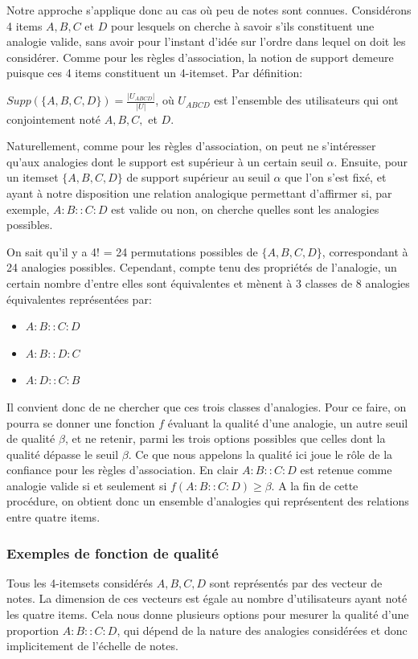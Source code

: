 Notre approche s'applique donc au cas o\`u peu de notes sont connues.  Considérons
4 items  $A, B, C$ et $D$ pour lesquels on cherche à savoir s'ils constituent
une analogie valide, sans avoir pour l'instant d'idée sur l'ordre dans lequel
on doit les considérer. Comme pour les règles d'association, la notion de
support demeure puisque ces 4 items constituent un 4-itemset.  Par
définition:

$Supp(\{A, B, C, D \})= \frac{|U_{ABCD}|}{|U|}$, où $U_{ABCD}$ est l'ensemble
des utilisateurs qui ont conjointement noté $A, B, C,$ et $D$.

Naturellement, comme pour les règles d'association, on peut ne
s'intéresser qu'aux analogies dont le support est supérieur à un certain
seuil $\alpha$.  Ensuite, pour un itemset $\{A, B, C, D \}$ de support
supérieur au seuil $\alpha$ que l'on s'est fixé, et ayant à notre
disposition une relation analogique permettant d'affirmer si, par exemple,
$A:B::C:D$ est valide ou non, on cherche quelles sont les analogies possibles. 

On sait qu'il y a 4! = 24 permutations possibles de $\{A, B, C, D \}$,
correspondant à 24 analogies possibles. Cependant, compte tenu des
propriétés de l'analogie, un certain nombre d'entre elles sont
équivalentes et mènent à 3 classes de 8 analogies équivalentes
représentées par:
\begin{itemize}
\item $A:B::C:D$
\item $A:B::D:C$
\item $A:D::C:B$
\end{itemize}
Il convient donc de ne chercher que ces trois classes d'analogies.  Pour ce
faire, on pourra se donner une fonction $f$ évaluant la qualité d'une
analogie, un autre seuil de qualité $\beta$, et ne retenir, parmi les trois
options possibles que celles dont la qualité dépasse le seuil $\beta$. Ce que
nous appelons la qualité ici joue le rôle de la confiance pour les règles
d'association.  En clair $A:B::C:D$ est retenue comme analogie  valide si et
seulement si $f(A:B::C:D) \geq \beta$.  A la fin de cette procédure, on obtient
donc un ensemble d'analogies qui représentent des relations entre quatre items.

\subsubsection{Exemples de fonction de qualité}
Tous les 4-itemsets considérés $A, B, C, D$ sont représentés par
des vecteur de notes.  La dimension de ces vecteurs est égale au nombre
d'utilisateurs ayant noté les quatre items.  Cela nous donne plusieurs options
pour mesurer la qualité d'une proportion $A:B::C:D$, qui dépend de la nature
des analogies considérées et donc implicitement de l'échelle de notes.

